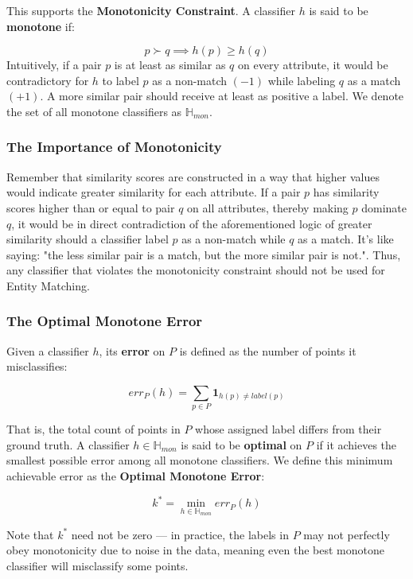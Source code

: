 \documentclass[11pt, a4paper]{article}
\theoremstyle{boxed}
\begin{document}
This supports the \textbf{Monotonicity Constraint}. A classifier $h$ is said to be \textbf{monotone} if:

$$p \succ q \implies h(p) \geq h(q)$$
Intuitively, if a pair $p$ is at least as similar as $q$ on every attribute, it would be contradictory for $h$ to label $p$ as a non-match $(-1)$ while labeling $q$ as a match $(+1)$. A more similar pair should receive at least as positive a label. We denote the set of all monotone classifiers as $\mathbb{H}_{mon}$.

\subsubsection{The Importance of Monotonicity}
Remember that similarity scores are constructed in a way that higher values would indicate greater similarity for each attribute. If a pair $p$ has similarity scores higher than or equal to pair $q$ on all attributes, thereby making $p$ dominate $q$, it would be in direct contradiction of the aforementioned logic of greater similarity should a classifier label $p$ as a non-match while $q$ as a match. It's like saying: "the less similar pair is a match, but the more similar pair is not.". Thus, any classifier that violates the monotonicity constraint should not be used for Entity Matching.

\subsubsection{The Optimal Monotone Error}
Given a classifier $h$, its \textbf{error} on $P$ is defined as the number of points it misclassifies:

$$err_P(h) = \sum_{p \in P} \mathbf{1}_{h(p) \neq label(p)}$$

That is, the total count of points in $P$ whose assigned label differs from their ground truth. A classifier $h \in \mathbb{H}_{mon}$ is said to be \textbf{optimal} on $P$ if it achieves the smallest possible error among all monotone classifiers. We define this minimum achievable error as the \textbf{Optimal Monotone Error}:

$$k^* = \min_{h \in \mathbb{H}_{mon}} err_P(h)$$

Note that $k^*$ need not be zero --- in practice, the labels in $P$ may not perfectly obey monotonicity due to noise in the data, meaning even the best monotone classifier will misclassify some points.
\end{document}
